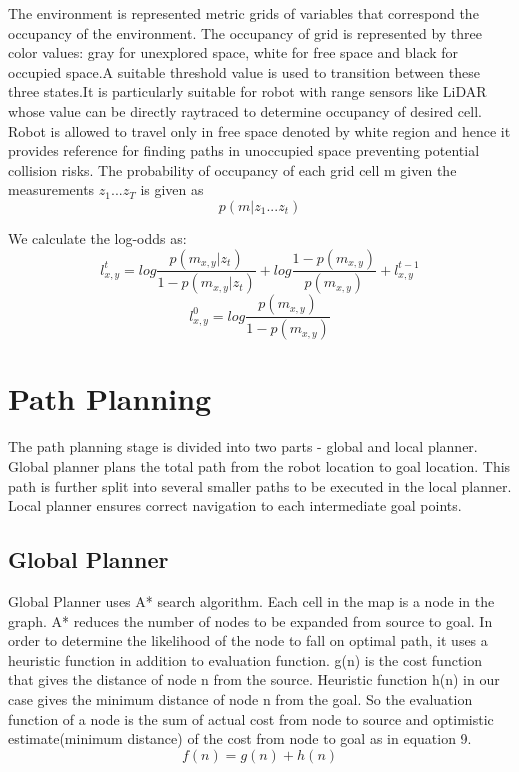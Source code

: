 \documentclass[journal,twoside]{IEEEtran}
\begin{document}
\par\noindent The environment is represented metric grids of variables that correspond the occupancy of the environment. The occupancy of grid is represented by three color values: gray for unexplored space, white for free space and black for occupied space.A suitable threshold value is used to transition between these three states.It is particularly suitable for robot with range sensors like LiDAR whose value can be directly raytraced to determine occupancy of desired cell. Robot is allowed to travel only in free space denoted by white region and hence it provides reference for finding paths in unoccupied space preventing potential collision risks. The probability of occupancy of each grid cell m given the measurements $z_1...z_T$ is given as
$$p(m|z_1...z_t)$$
\par\noindent We calculate the log-odds as: \newline
\begin{equation}
l^t_{x,y} = log\frac{p(m_{x,y}|z_t)}{1-p(m_{x,y}|z_t)}+ log\frac{1-p(m_{x,y})}{p(m_{x,y})}+l^{t-1}_{x,y} 
\end{equation} 
\begin{equation}
l^0_{x,y} = log\frac{p(m_{x,y})}{1-p(m_{x,y})}
\end{equation} 
\section{Path Planning}
\noindent The path planning stage is divided into two parts - global and local planner. Global planner plans the total path from the robot location to goal location. This path is further split into several smaller paths to be executed in the local planner. Local planner ensures correct navigation to each intermediate goal points.

\subsection{Global Planner}
\noindent Global Planner uses A* search algorithm. Each cell in the map is a node in the graph. A* reduces the number of nodes to be expanded from source to goal. In order to determine the likelihood of the node to fall on optimal path, it uses a heuristic function in addition to evaluation function. g(n) is the cost function that gives the distance of node n from the source. Heuristic function h(n) in our case gives the minimum distance of node n from the goal. So the evaluation function of a node is the sum of actual cost from node to source and optimistic estimate(minimum distance) of the cost from node to goal as in equation 9.
\begin{equation}
f(n) = g(n) + h(n)
\end{equation}
\end{document}
